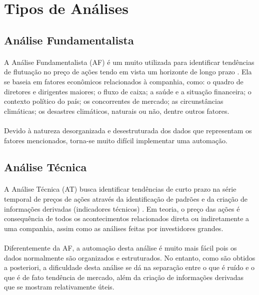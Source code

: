 \section{Tipos de Análises}

\subsection{Análise Fundamentalista}

\paragraph{} A Análise Fundamentalista (AF) é um muito utilizada para identificar tendências de flutuação no preço de ações tendo em vista um horizonte de longo prazo \cite{bulkowski2012fundamental}. Ela se baseia em fatores econômicos relacionados à companhia, como: o quadro de diretores e dirigentes maiores; o fluxo de caixa; a saúde e a situação financeira; o contexto político do país; os concorrentes de mercado; as circunstâncias climáticas; os desastres climáticos, naturais ou não, dentre outros fatores.

\paragraph{} Devido à natureza desorganizada e desestruturada dos dados que representam os fatores mencionados, torna-se muito difícil implementar uma automação.

\subsection{Análise Técnica}
\label{subsection:at}

\paragraph{} A Análise Técnica (AT) busca identificar tendências de curto prazo na série temporal de preços de ações através da identificação de padrões e da criação de informações derivadas (indicadores técnicos) \cite{murphy1999technical, edwards2018technical}. Em teoria, o preço das ações é consequência de todos os acontecimentos relacionados direta ou indiretamente a uma companhia, assim como as análises feitas por investidores grandes.

\paragraph{} Diferentemente da AF, a automação desta análise é muito mais fácil pois os dados normalmente são organizados e estruturados. No entanto, como são obtidos a posteriori, a dificuldade desta análise se dá na separação entre o que é ruído e o que é de fato tendência de mercado, além da criação de informações derivadas que se mostram relativamente úteis.

